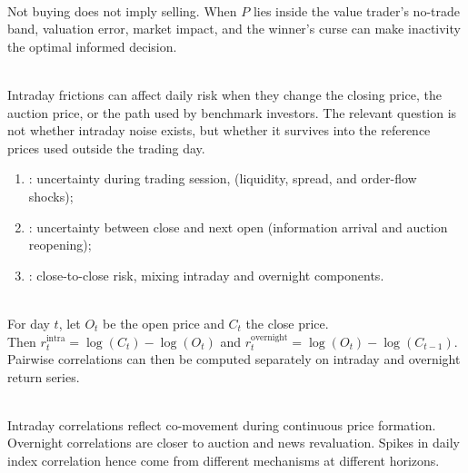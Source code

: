 \documentclass[a4paper,oneside,openany]{book}
\begin{document}
\begin{caveat} \\
Not buying does not imply selling. When $P$ lies inside the value trader's no-trade band, valuation error, market impact, and the winner's curse can make inactivity the optimal informed decision.
\end{caveat}

\begin{principle} \\
Intraday frictions can affect daily risk when they change the closing price, the auction price, or the path used by benchmark investors. The relevant question is not whether intraday noise exists, but whether it survives into the reference prices used outside the trading day.
\end{principle}

\begin{taxonomy} 
\begin{enumerate}[label=\roman*.]
\setlength{\itemsep}{0pt}
\item {}: uncertainty during trading session, (liquidity, spread, and order-flow shocks);
\item {}: uncertainty between close and next open (information arrival and auction reopening);
\item {}: close-to-close risk, mixing intraday and overnight components.
\end{enumerate}
\end{taxonomy}

\begin{definition} \\
For day $t$, let $O_t$ be the open price and $C_t$ the close price.\\
Then $r_t^{\text{intra}}=\log(C_t)-\log(O_t)$ and $r_t^{\text{overnight}}=\log(O_t)-\log(C_{t-1})$.\\
Pairwise correlations can then be computed separately on intraday and overnight return series.
\end{definition}

\begin{caveat} \\
Intraday correlations reflect co-movement during continuous price formation.\\
Overnight correlations are closer to auction and news revaluation. Spikes in daily index correlation hence come from different mechanisms at different horizons.
\end{caveat}
\end{document}
